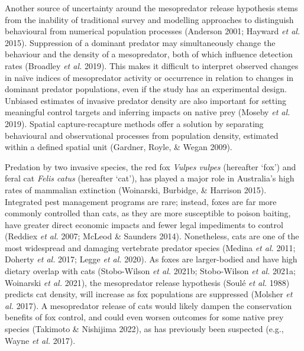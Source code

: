 \documentclass[preprint, 3p, authoryear]{elsarticle} %
\begin{document}
Another source of uncertainty around the mesopredator release hypothesis stems from the inability of traditional survey and modelling approaches to distinguish behavioural from numerical population processes (Anderson 2001; Hayward \emph{et al.} 2015). Suppression of a dominant predator may simultaneously change the behaviour and the density of a mesopredator, both of which influence detection rates (Broadley \emph{et al.} 2019). This makes it difficult to interpret observed changes in naïve indices of mesopredator activity or occurrence in relation to changes in dominant predator populations, even if the study has an experimental design. Unbiased estimates of invasive predator density are also important for setting meaningful control targets and inferring impacts on native prey (Moseby \emph{et al.} 2019). Spatial capture-recapture methods offer a solution by separating behavioural and observational processes from population density, estimated within a defined spatial unit (Gardner, Royle, \& Wegan 2009).

Predation by two invasive species, the red fox \emph{Vulpes vulpes} (hereafter `fox') and feral cat \emph{Felis catus} (hereafter `cat'), has played a major role in Australia's high rates of mammalian extinction (Woinarski, Burbidge, \& Harrison 2015). Integrated pest management programs are rare; instead, foxes are far more commonly controlled than cats, as they are more susceptible to poison baiting, have greater direct economic impacts and fewer legal impediments to control (Reddiex \emph{et al.} 2007; McLeod \& Saunders 2014). Nonetheless, cats are one of the most widespread and damaging vertebrate predator species (Medina \emph{et al.} 2011; Doherty \emph{et al.} 2017; Legge \emph{et al.} 2020). As foxes are larger-bodied and have high dietary overlap with cats (Stobo-Wilson \emph{et al.} 2021b; Stobo-Wilson \emph{et al.} 2021a; Woinarski \emph{et al.} 2021), the mesopredator release hypothesis (Soulé \emph{et al.} 1988) predicts cat density, will increase as fox populations are suppressed (Molsher \emph{et al.} 2017). A mesopredator release of cats would likely dampen the conservation benefits of fox control, and could even worsen outcomes for some native prey species (Takimoto \& Nishijima 2022), as has previously been suspected (e.g., Wayne \emph{et al.} 2017).
\end{document}
